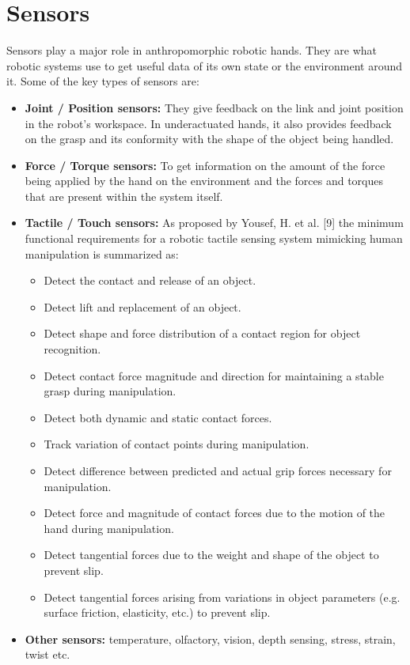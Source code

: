 \documentclass[a4paper, 10pt, conference]{ieeeconf}      %
\begin{document}
\section{\textbf{Sensors}}
Sensors play a major role in anthropomorphic robotic hands. They are what robotic systems use to get useful data of its own state or the environment around it. Some of the key types of sensors are:\\
	\begin{itemize}
	\item \textbf{Joint / Position sensors:} They give feedback on the link and joint position in the robot’s workspace. In underactuated hands, it also provides feedback on the grasp and its conformity with the shape of the object being handled.\\
	\item \textbf{Force / Torque sensors:} To get information on the amount of the force being applied by the hand on the environment and the forces and torques that are present within the system itself.\\
	\item \textbf{Tactile / Touch sensors:} As proposed by Yousef, H. et al. [9] the minimum functional requirements for a robotic tactile sensing system mimicking human manipulation is summarized as:\\
		\begin{itemize}
			\item Detect the contact and release of an object.
			\item Detect lift and replacement of an object.
			\item Detect shape and force distribution of a contact region for object recognition.
			\item Detect contact force magnitude and direction for maintaining a stable grasp during manipulation.
			\item Detect both dynamic and static contact forces.
			\item Track variation of contact points during manipulation.
			\item Detect difference between predicted and actual grip forces necessary for manipulation.
			\item Detect force and magnitude of contact forces due to the motion of the hand during manipulation.
			\item Detect tangential forces due to the weight and shape of the object to prevent slip.
			\item Detect tangential forces arising from variations in object parameters (e.g. surface friction, elasticity, etc.) to prevent slip.\\
		\end{itemize}
	\item \textbf{Other sensors:} temperature, olfactory, vision, depth sensing, stress, strain, twist etc.\\
	\end{itemize}
\end{document}
